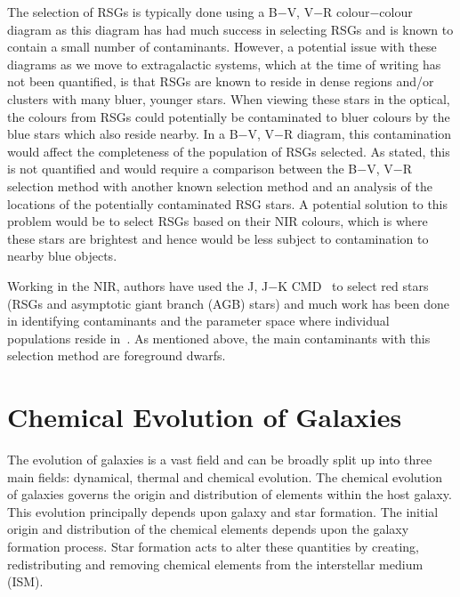 The selection of RSGs is typically done using a B$-$V, V$-$R colour$-$colour diagram as this diagram has had much success in selecting RSGs and is known to contain a small number of contaminants.
However, a potential issue with these diagrams as we move to extragalactic systems, which at the time of writing has not been quantified, is that RSGs are known to reside in dense regions and/or clusters with many bluer, younger stars.
When viewing these stars in the optical, the colours from RSGs could potentially be contaminated to bluer colours by the blue stars which also reside nearby.
In a B$-$V, V$-$R diagram, this contamination would affect the completeness of the population of RSGs selected.
As stated, this is not quantified and would require a comparison between the B$-$V, V$-$R selection method with another known selection method and an analysis of the locations of the potentially contaminated RSG stars.
A potential solution to this problem would be to select RSGs based on their NIR colours, which is where these stars are brightest and hence would be less subject to contamination to nearby blue objects.

Working in the NIR, authors have used the J, J$-$K CMD~\citep{Nikolaev00, Cioni06,Neugent12} to select red stars (RSGs and asymptotic giant branch (AGB) stars) and much work has been done in identifying contaminants and the parameter space where individual populations reside in~\citep{Cioni06}.
As mentioned above, the main contaminants with this selection method are foreground dwarfs.



\section{Chemical Evolution of Galaxies} %
\label{sec:chemical_evolution_of_galaxies}

The evolution of galaxies is a vast field and can be broadly split up into three main fields: dynamical, thermal and chemical evolution.
The chemical evolution of galaxies governs the origin and distribution of elements within the host galaxy.
This evolution principally depends upon galaxy and star formation.
The initial origin and distribution of the chemical elements depends upon the galaxy formation process.
Star formation acts to alter these quantities by creating, redistributing and removing chemical elements from the interstellar medium (ISM).


